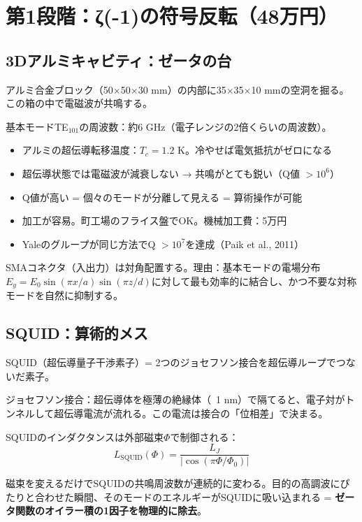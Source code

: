 \documentclass[12pt,a4paper]{article}
\begin{document}
\section{第1段階：ζ(-1)の符号反転（48万円）}

\subsection{3Dアルミキャビティ：ゼータの台}

アルミ合金ブロック（50$\times$50$\times$30 mm）の内部に35$\times$35$\times$10 mmの空洞を掘る。この箱の中で電磁波が共鳴する。

基本モードTE$_{101}$の周波数：約6 GHz（電子レンジの2倍くらいの周波数）。

\begin{physbox}[なぜアルミか]
\begin{itemize}
\item アルミの超伝導転移温度：$T_c = 1.2$ K。冷やせば電気抵抗がゼロになる
\item 超伝導状態では電磁波が減衰しない → 共鳴がとても鋭い（Q値 $> 10^6$）
\item Q値が高い = 個々のモードが分離して見える = 算術操作が可能
\item 加工が容易。町工場のフライス盤でOK。機械加工費：5万円
\item Yaleのグループが同じ方法でQ $> 10^7$を達成（Paik et al., 2011）
\end{itemize}
\end{physbox}

SMAコネクタ（入出力）は対角配置する。理由：基本モードの電場分布$E_y = E_0 \sin(\pi x/a)\sin(\pi z/d)$に対して最も効率的に結合し、かつ不要な対称モードを自然に抑制する。

\subsection{SQUID：算術的メス}

SQUID（超伝導量子干渉素子）= 2つのジョセフソン接合を超伝導ループでつないだ素子。

ジョセフソン接合：超伝導体を極薄の絶縁体（~1 nm）で隔てると、電子対がトンネルして超伝導電流が流れる。この電流は接合の「位相差」で決まる。

SQUIDのインダクタンスは外部磁束$\Phi$で制御される：
$$L_{\mathrm{SQUID}}(\Phi) = \frac{L_J}{|\cos(\pi\Phi/\Phi_0)|}$$

磁束を変えるだけでSQUIDの共鳴周波数が連続的に変わる。目的の高調波にぴたりと合わせた瞬間、そのモードのエネルギーがSQUIDに吸い込まれる = \textbf{ゼータ関数のオイラー積の1因子を物理的に除去}。
\end{document}
